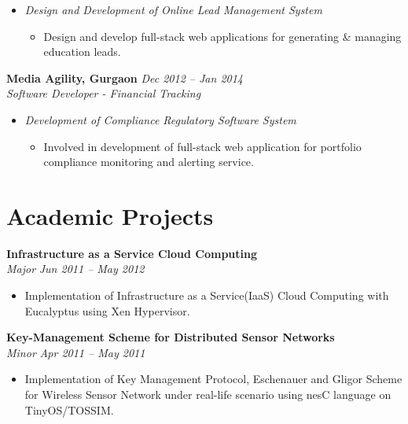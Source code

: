 \documentclass[margin,line]{resume}
\begin{document}
\begin{resume}
\begin{itemize}
     \item \textsl{Design and Development of Online Lead Management System}
        \begin{itemize}
            \item Design and develop full-stack web applications for generating \& managing education leads.
        \end{itemize}
   \end{itemize}

\textbf{Media Agility, Gurgaon}   \hfill \textsl{Dec 2012 -- Jan 2014} \vspace{0mm}\\\vspace{0mm}%
           \textsl{Software Developer - Financial Tracking}\\
    \begin{itemize}
    
     \item \textsl{Development of Compliance Regulatory Software System} 
        \begin{itemize}
            \item Involved in development of full-stack web application for portfolio compliance monitoring and alerting service.
        \end{itemize}
    
    \end{itemize}

    
    \section{\mysidestyle Academic Projects}
    \textbf{Infrastructure as a Service Cloud Computing}\vspace{0mm}\\\vspace{0mm}%
    \textsl{Major} \hfill \textsl{Jun 2011 -- May 2012}
       \begin{itemize} 
	        \item Implementation of Infrastructure as a Service(IaaS) Cloud Computing with Eucalyptus using Xen Hypervisor.
       \end{itemize}

    \textbf{Key-Management Scheme for Distributed Sensor Networks}\vspace{0mm}\\\vspace{0mm}%
    \textsl{Minor} \hfill \textsl{Apr 2011 -- May 2011}
       \begin{itemize} 
            \item Implementation of Key Management Protocol, Eschenauer and Gligor Scheme for Wireless Sensor Network under real-life scenario using nesC language on TinyOS/TOSSIM.
       \end{itemize}
\end{resume}
\end{document}
